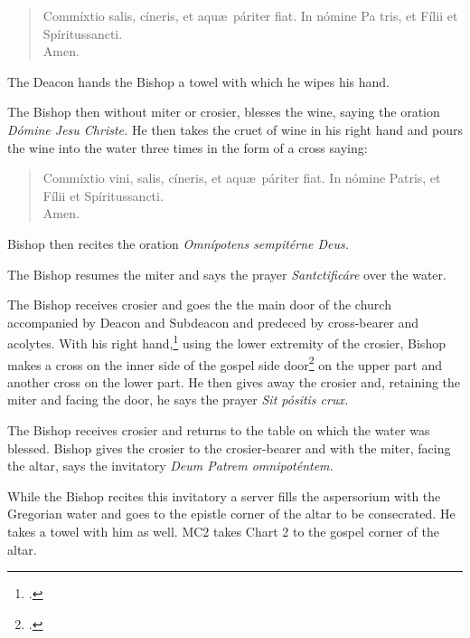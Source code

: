 \documentclass[letterpaper]{report}
\begin{document}
{    \begin{quote}
        Commíxtio salis, cíneris, et aqu\ae\ páriter fiat. In nómine Pa\cross
        tris, et Fí\cross lii et Spíritus\cross sancti. \\
        \rbar Amen.
    \end{quote}

    The Deacon hands the Bishop a towel with which he wipes his hand.

    \rubric The Bishop then without miter or crosier, blesses the wine, saying
    the oration \textit{D\'omine Jesu Christe.} He then takes the cruet of wine
    in his right hand and pours the wine into the water three times in the form
    of a cross saying:

    \begin{quote}
        Commíxtio vini, salis, cíneris, et aqu\ae\ páriter fiat. In nómine
        Pa\cross tris, et Fí\cross lii et Spíritus\cross sancti. \\
        \rbar Amen.
    \end{quote}

    Bishop then recites the oration \textit{Omn\'ipotens sempit\'erne Deus.}

    \rubric The Bishop resumes the miter and says the prayer
    \textit{Santcti\cross ficáre} over the water.

    \rubric The Bishop receives crosier and goes the the main door of the
    church accompanied by Deacon and Subdeacon and predeced by cross-bearer and
    acolytes. With his right hand,\footcite[][p. 291.]{moretti:4} using the
    lower extremity of the crosier, Bishop makes a cross on the inner side of
    the gospel side door\footcite[][p. 291]{moretti:4} on the upper part and
    another cross on the lower part. He then gives away the crosier and,
    retaining the miter and facing the door, he says the prayer \textit{Sit
    pósitis crux.}

    \rubric The Bishop receives crosier and returns to the table on which the
    water was blessed. Bishop gives the crosier to the crosier-bearer and with
    the miter, facing the altar, says the invitatory \textit{Deum Patrem
    omnipoténtem.}

    While the Bishop recites this invitatory a server fills the aspersorium
    with the Gregorian water and goes to the epistle corner of the altar to be
    consecrated. He takes a towel with him as well. MC2 takes Chart 2 to the
    gospel corner of the altar.

}
\end{document}
